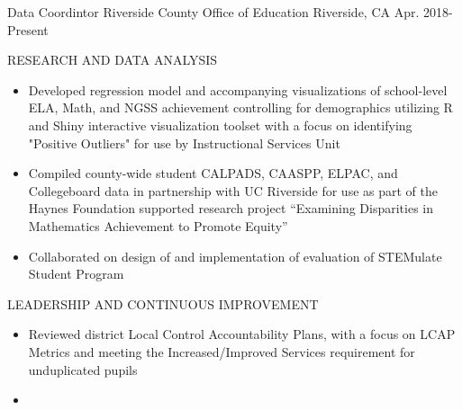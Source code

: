 

\begin{cventries}

  \cventry
    {Data Coordintor} %
    {Riverside County Office of Education} %
    {Riverside, CA} %
    {Apr. 2018-Present} %
    {
      \begin{cvitems} %
          \item RESEARCH AND DATA ANALYSIS
          \begin{itemize}
            \item {Developed regression model and accompanying visualizations of school-level ELA, Math, and NGSS achievement controlling for demographics utilizing R and Shiny interactive visualization toolset with a focus on identifying "Positive Outliers" for use by Instructional Services Unit}
            \item {Compiled county-wide student CALPADS, CAASPP, ELPAC, and Collegeboard data in partnership with UC Riverside for use as part of the Haynes Foundation supported research project “Examining Disparities in Mathematics Achievement to Promote Equity”}
            \item {Collaborated on design of and implementation of evaluation of STEMulate Student Program}
          \end{itemize}
          \item LEADERSHIP AND CONTINUOUS IMPROVEMENT
          \begin{itemize}
            \item {Reviewed district Local Control Accountability Plans, with a focus on LCAP Metrics and meeting the Increased/Improved Services requirement for unduplicated pupils}
            \item {}
          \end{itemize}
      \end{cvitems}
    }


\end{cventries}
